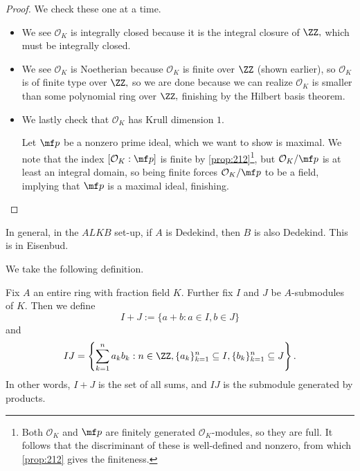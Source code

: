\begin{proof}
    We check these one at a time.
    \begin{itemize}
        \item We see $\mathcal O_K$ is integrally closed because it is the integral closure of $\ZZ,$ which must be integrally closed.
        \item We see $\mathcal O_K$ is Noetherian because $\mathcal O_K$ is finite over $\ZZ$ (shown earlier), so $\mathcal O_K$ is of finite type over $\ZZ,$ so we are done because we can realize $\mathcal O_K$ is smaller than some polynomial ring over $\ZZ,$ finishing by the Hilbert basis theorem.
        \item We lastly check that $\mathcal O_K$ has Krull dimension $1.$
        
        Let $\mf p$ be a nonzero prime ideal, which we want to show is maximal.
        We note that the index $[\mathcal O_K:\mf p]$ is finite by \autoref{prop:212}\footnote{Both $\mathcal O_K$ and $\mf p$ are finitely generated $\mathcal O_K$-modules, so they are full. It follows that the discriminant of these is well-defined and nonzero, from which \autoref{prop:212} gives the finiteness.}, but $\mathcal O_K/\mf p$ is at least an integral domain, so being finite forces $\mathcal O_K/\mf p$ to be a field, implying that $\mf p$ is a maximal ideal, finishing.
        \qedhere
    \end{itemize}
\end{proof}
\begin{remark}
    In general, in the $ALKB$ set-up, if $A$ is Dedekind, then $B$ is also Dedekind. This is in Eisenbud.
\end{remark}
We take the following definition.
\begin{defi}
    Fix $A$ an entire ring with fraction field $K.$ Further fix $I$ and $J$ be $A$-submodules of $K.$ Then we define
    \[I+J:=\{a+b:a\in I,b\in J\}\]
    and
    \[IJ=\left\{\sum_{k=1}^na_kb_k:n\in\ZZ,\{a_k\}_{k=1}^n\subseteq I,\{b_k\}_{k=1}^n\subseteq J\right\}.\]
    In other words, $I+J$ is the set of all sums, and $IJ$ is the submodule generated by products.
\end{defi}
